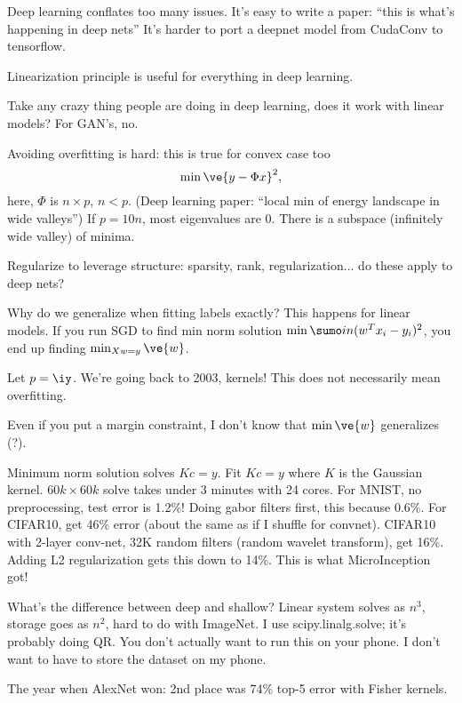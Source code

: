 Deep learning conflates too many issues. It's easy to write a paper: ``this is what's happening in deep nets'' It's harder to port a deepnet model from CudaConv to tensorflow.

Linearization principle is useful for everything in deep learning.

Take any crazy thing people are doing in deep learning, does it work with linear models? For GAN's, no.

Avoiding overfitting is hard: this is true for convex case too
$$
\min \ve{y-\Phi x}^2,
$$ 
here, $\Phi$ is $n\times p$, $n<p$. (Deep learning paper: ``local min of energy landscape in wide valleys'')
If $p=10n$, most eigenvalues are 0. There is a subspace (infinitely wide valley) of minima.

Regularize to leverage structure: sparsity, rank, regularization... do these apply to deep nets?

Why do we generalize when fitting labels exactly? This happens for linear models. If you run SGD to find min norm solution $\min\sumo in (w^Tx_i-y_i)^2$, you end up finding $\min_{Xw=y} \ve{w}$.


Let $p=\iy$. We're going back to 2003, kernels! This does not necessarily mean overfitting. 

Even if you put a margin constraint, I don't know that $\min \ve{w}$  generalizes (?).  %

Minimum norm solution solves $Kc=y$. Fit $Kc=y$ where $K$ is the Gaussian kernel. $60k\times 60k$ solve takes under 3 minutes with 24 cores.
For MNIST, no preprocessing, test error is 1.2\%! Doing gabor filters first, this because 0.6\%. For CIFAR10, get 46\% error (about the same as if I shuffle for convnet). CIFAR10 with 2-layer conv-net, 32K random filters (random wavelet transform), get 16\%. 
Adding L2 regularization gets this down to 14\%. This is what MicroInception got!

What's the difference between deep and shallow? Linear system solves as $n^3$, storage goes as $n^2$, hard to do with ImageNet. I use scipy.linalg.solve; it's probably doing QR.
You don't actually want to run this on your phone. I don't want to have to store the dataset on my phone. %

The year when AlexNet won: 2nd place was 74\% top-5 error with Fisher kernels.

